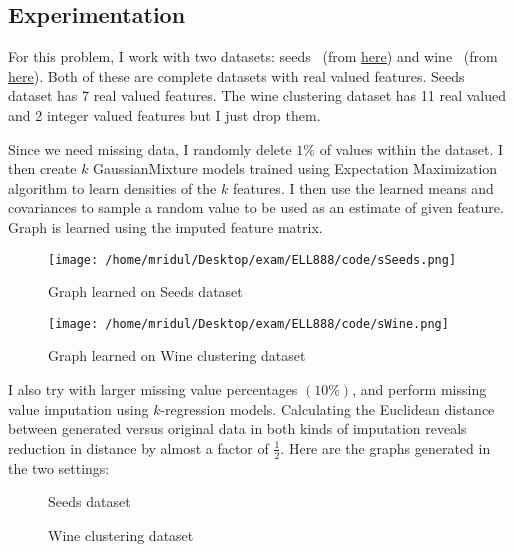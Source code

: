 \documentclass[11pt]{article}
\begin{document}
\subsection{Experimentation}
\label{sec:org8003e69}
For this problem, I work with two datasets: seeds~\cite{repo,seeds} (from
\href{https://archive.ics.uci.edu/ml/datasets/seeds}{here}) and wine~\cite{repo,wine} (from \href{https://www.kaggle.com/harrywang/wine-dataset-for-clustering}{here}). Both of these are complete
datasets with real valued features. Seeds dataset has 7 real valued
features. The wine clustering dataset has 11 real valued and 2 integer
valued features but I just drop them.\par
Since we need missing data, I randomly delete \(1\%\) of values within
the dataset. I then create \(k\) GaussianMixture models trained using
Expectation Maximization algorithm to learn densities of the \(k\)
features. I then use the learned means and covariances to sample a
random value to be used as an estimate of given feature. Graph is
learned using the imputed feature matrix.
\begin{figure}[!htbp]
\centering
\texttt{[image: /home/mridul/Desktop/exam/ELL888/code/sSeeds.png]}
\caption{Graph learned on Seeds dataset}
\end{figure}
\begin{figure}[!htbp]
\centering
\texttt{[image: /home/mridul/Desktop/exam/ELL888/code/sWine.png]}
\caption{Graph learned on Wine clustering dataset}
\end{figure}
\clearpage
I also try with larger missing value percentages \((10\%)\), and perform
missing value imputation using \(k\)-regression models. Calculating the Euclidean distance
between generated versus original data in both kinds of imputation reveals reduction in
distance by almost a factor of \(\frac{1}{2}\). Here are the graphs generated in the two settings:
\begin{figure}[!htbp]
    \begin{center}
        \caption{Seeds dataset}
    \end{center}
\end{figure}
\begin{figure}[!htbp]
    \begin{center}
        \caption{Wine clustering dataset}
    \end{center}
\end{figure}
\clearpage
\end{document}
